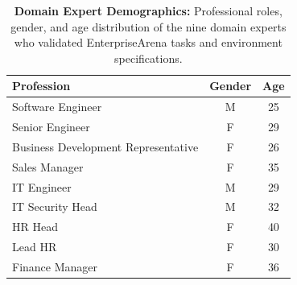 \documentclass{article}
\theoremstyle{plain}
\theoremstyle{definition}
\theoremstyle{remark}
\begin{document}
\begin{table}[H]
\centering
\caption{\textbf{Domain Expert Demographics:} Professional roles, gender, and age distribution of the nine domain experts who validated EnterpriseArena tasks and environment specifications.}
\label{tab:profession_data}
\begin{tabular}{lcc}
\toprule
\textbf{Profession} & \textbf{Gender} & \textbf{Age} \\
\midrule
Software Engineer & M & 25 \\
Senior Engineer & F & 29 \\
\midrule
Business Development Representative & F & 26 \\
Sales Manager & F & 35 \\
\midrule
IT Engineer & M & 29 \\
IT Security Head & M & 32 \\
\midrule
HR Head & F & 40 \\
Lead HR & F & 30 \\
\midrule
Finance Manager & F & 36 \\
\bottomrule
\end{tabular}
\end{table}
\end{document}
